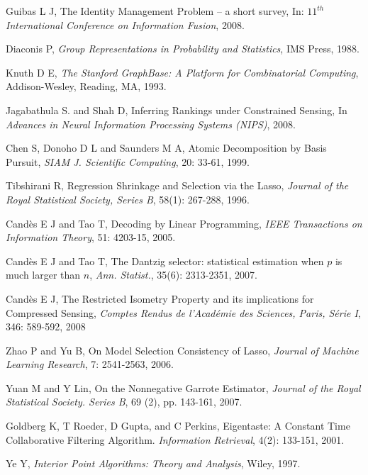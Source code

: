 \documentclass{article}
\begin{document}
\begin{thebibliography}{20}
\small

Guibas L J, The Identity Management Problem -- a short survey, In: {\it $11^{th}$ International Conference on Information Fusion}, 2008.

Diaconis P, {\it Group Representations in Probability and Statistics}, IMS Press, 1988.

Knuth D E, {\it The Stanford GraphBase: A Platform for Combinatorial Computing}, Addison-Wesley, Reading, MA, 1993.

Jagabathula S. and Shah D, Inferring Rankings under Constrained Sensing, In {\it Advances in Neural Information Processing Systems (NIPS)}, 2008.

Chen S, Donoho D L and Saunders M A, Atomic Decomposition by Basis Pursuit, {\it SIAM J. Scientific Computing}, 20: 33-61, 1999.

Tibshirani R, Regression Shrinkage and Selection via the Lasso, {\it Journal of the Royal Statistical Society, Series B}, 58(1): 267-288, 1996.

Cand\`{e}s E J and Tao T, Decoding by Linear Programming, {\it IEEE Transactions on Information Theory}, 51: 4203-15, 2005.

Cand\`{e}s E J and Tao T, The Dantzig selector: statistical estimation when $p$ is much larger than $n$, {\it Ann. Statist.}, 35(6): 2313-2351, 2007.

Cand\`{e}s E J, The Restricted Isometry Property and its implications for 
Compressed Sensing, {\it Comptes Rendus de l'Acad\'{e}mie des Sciences, Paris, S\'{e}rie I}, 346: 589-592, 2008

Zhao P and Yu B, On Model Selection Consistency of Lasso, {\it Journal of Machine Learning Research}, 7: 2541-2563, 2006.

Yuan M and Y Lin, On the Nonnegative Garrote Estimator, {\it Journal of the Royal Statistical Society. Series B}, 69 (2), pp. 143-161, 2007.

Goldberg K, T Roeder, D Gupta, and C Perkins, Eigentaste: A Constant Time Collaborative Filtering Algorithm. {\it Information Retrieval}, 4(2): 133-151, 2001.

Ye Y, {\it Interior Point Algorithms: Theory and Analysis}, Wiley, 1997.
\end{thebibliography}
\end{document}
